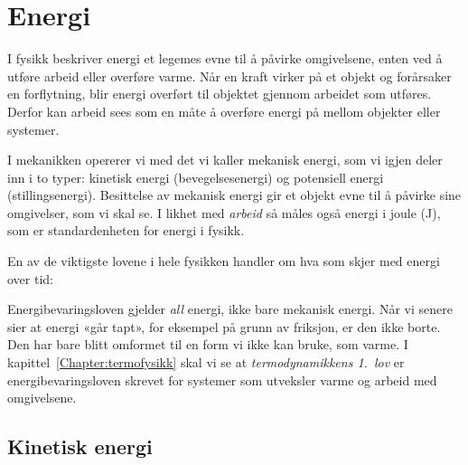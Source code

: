 

\section{Energi}

I fysikk beskriver energi et legemes evne til å påvirke omgivelsene, enten ved å utføre arbeid eller overføre varme. Når en kraft virker på et objekt og forårsaker en forflytning, blir energi overført til objektet gjennom arbeidet som utføres. Derfor kan arbeid sees som en måte å overføre energi på mellom objekter eller systemer. 

I mekanikken opererer vi med det vi kaller mekanisk energi, som vi igjen deler inn i to typer: kinetisk energi (bevegelsesenergi) og potensiell energi (stillingsenergi). Besittelse av mekanisk energi gir et objekt evne til å påvirke sine omgivelser, som vi skal se. I likhet med \textit{arbeid} så måles også energi i joule (J), som er standardenheten for energi i fysikk.


En av de viktigste lovene i hele fysikken handler om hva som skjer med energi over tid:


Energibevaringsloven gjelder \emph{all} energi, ikke bare mekanisk energi. Når vi senere sier at energi «går tapt», for eksempel på grunn av friksjon, er den ikke borte. Den har bare blitt omformet til en form vi ikke kan bruke, som varme. I kapittel~\ref{Chapter:termofysikk} skal vi se at \textit{termodynamikkens 1.\ lov} er energibevaringsloven skrevet for systemer som utveksler varme og arbeid med omgivelsene.

\subsection{Kinetisk energi}

